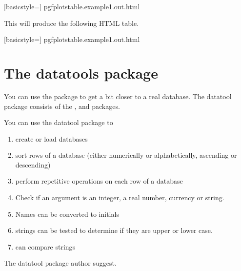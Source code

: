 {\begin{teX}


    [basicstyle=\ttfamily\small]
    {pgfplotstable.example1.out.html}
\end{teX}

This will produce the following HTML table. 



[basicstyle=\ttfamily\small]
{pgfplotstable.example1.out.html}



\section{The datatools package}
\normalsize
{}
You can use the  package to get a bit closer to a real database. The datatool package consists of the ,  and  packages. 

You can use the datatool package to
\begin{enumerate}
\item create or load databases
\item sort rows of a database (either numerically or alphabetically, ascending or descending)
\item perform repetitive operations on each row of a database
\item Check if an argument is an integer, a real number, currency or string.
\item Names can be converted to initials
\item strings can be tested to determine if they are upper or lower case.
\item can compare strings
\end{enumerate}

The datatool package author suggest. 

}
